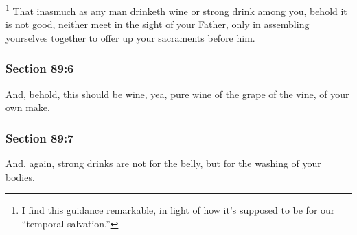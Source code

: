 			\footnote{%
				I find this guidance remarkable, in light of how it's supposed to be for our ``temporal salvation.'' 
				}%
		That inasmuch as any man drinketh wine or strong drink among you, behold it is not good, neither meet in the sight of your Father, only in assembling yourselves together to offer up your sacraments before him.


	\subsubsection{Section 89:6} %
		\label{DC89-6}

		And, behold, this should be wine, yea, pure wine of the grape of the vine, of your own make.


	\subsubsection{Section 89:7} %
		\label{DC89-7}

		And, again, strong drinks are not for the belly, but for the washing of your bodies.


